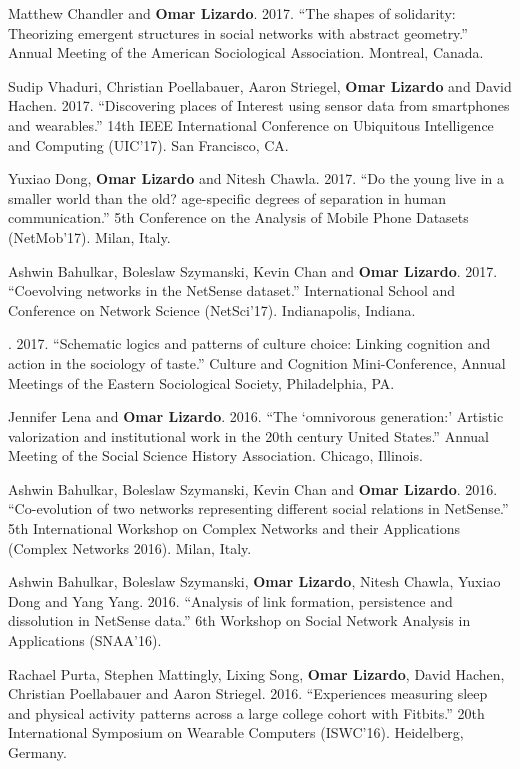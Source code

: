 
\ind Matthew Chandler and {\bf Omar Lizardo}. 2017. ``The shapes of solidarity: Theorizing emergent structures in social networks with abstract geometry.''  Annual Meeting of the American Sociological Association. Montreal, Canada. 

\ind Sudip Vhaduri, Christian Poellabauer, Aaron Striegel, {\bf Omar Lizardo} and David Hachen. 2017. ``Discovering places of Interest using sensor data from smartphones and wearables.'' 14th IEEE International Conference on Ubiquitous Intelligence and Computing (UIC'17). San Francisco, CA.

\ind Yuxiao Dong, {\bf Omar Lizardo} and Nitesh Chawla. 2017. ``Do the young live in a smaller world than the old? age-specific degrees of separation in human communication.'' 5th Conference on the Analysis of Mobile Phone Datasets (NetMob'17). Milan, Italy. 

\ind Ashwin Bahulkar, Boleslaw Szymanski, Kevin Chan and {\bf Omar Lizardo}. 2017.	``Coevolving networks in the NetSense dataset.'' International School and Conference on Network Science (NetSci'17). Indianapolis, Indiana. 

. 2017. ``Schematic logics and patterns of culture choice: Linking cognition and action in the sociology of taste.'' Culture and Cognition Mini-Conference, Annual Meetings of the Eastern Sociological Society, Philadelphia, PA.

\ind Jennifer Lena and {\bf Omar Lizardo}. 2016. ``The `omnivorous generation:' Artistic valorization and institutional work in the 20th century United States.'' Annual Meeting of the Social Science History Association. Chicago, Illinois. 

\ind Ashwin Bahulkar, Boleslaw Szymanski, Kevin Chan and {\bf Omar Lizardo}. 2016. ``Co-evolution of two networks representing different social relations in NetSense.'' 5th International Workshop on Complex Networks and their Applications (Complex Networks 2016). Milan, Italy. 

\ind Ashwin Bahulkar, Boleslaw Szymanski, {\bf Omar Lizardo}, Nitesh Chawla, Yuxiao Dong and Yang Yang.	2016. ``Analysis of link formation, persistence and dissolution in NetSense data.'' 6th Workshop on Social Network Analysis in Applications (SNAA'16).

\ind Rachael Purta, Stephen Mattingly, Lixing Song, {\bf Omar Lizardo}, David Hachen, Christian Poellabauer and Aaron Striegel. 2016. ``Experiences measuring sleep and physical activity patterns across a large college cohort with Fitbits.'' 20th International Symposium on Wearable Computers (ISWC'16). Heidelberg, Germany.

